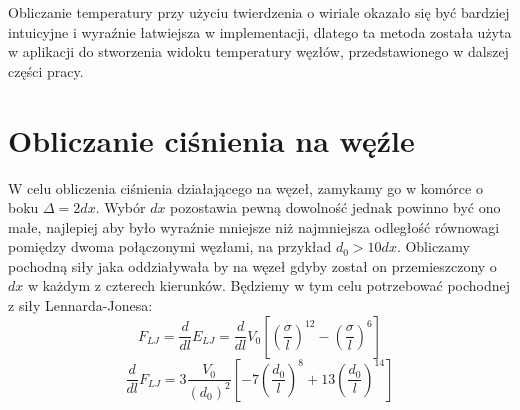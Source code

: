 \documentclass[12pt, letterpaper]{report}
\begin{document}

    Obliczanie temperatury przy użyciu twierdzenia o wiriale okazało się być bardziej intuicyjne i
    wyraźnie łatwiejsza w implementacji, dlatego ta metoda została użyta w aplikacji do stworzenia widoku 
    temperatury węzłów, przedstawionego w dalszej części pracy.
    
    \clearpage
    \section{Obliczanie ciśnienia na węźle}
    W celu obliczenia ciśnienia działającego na węzeł, zamykamy go w komórce 
    o boku $\Delta = 2 dx$. Wybór $dx$ pozostawia pewną dowolność jednak powinno być ono małe, najlepiej aby było wyraźnie 
    mniejsze niż najmniejsza odległość równowagi pomiędzy dwoma połączonymi węzłami, na przykład $d_0 > 10 dx$. 
    Obliczamy pochodną siły jaka oddziaływała 
    by na węzeł gdyby został on przemieszczony o $dx$ w każdym z czterech kierunków. 
    Będziemy w tym celu potrzebować pochodnej z siły Lennarda-Jonesa:
    \begin{equation}
        F_{LJ} = 
        \frac{d}{dl} E_{LJ} = 
        \frac{d}{dl} V_0 \left[ \left( \frac{\sigma}{l} \right)^{12} - \left( \frac{\sigma}{l} \right)^{6} \right]
    \end{equation}
    \begin{equation}
        \frac{d}{dl} F_{LJ} = 3\frac{V_0}{(d_0)^2} \left[ -7 \left(\frac{d_0}{l}\right)^{8} + 13 \left(\frac{d_0}{l}\right)^{14} \right]
    \end{equation}
    
\end{document}
